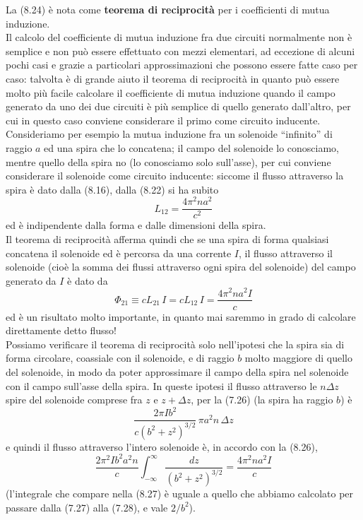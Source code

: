 La (8.24) \`e nota come \textbf{teorema di reciprocit\`a} per i coefficienti di
mutua induzione.\\
Il calcolo del coefficiente di mutua induzione fra due circuiti normalmente non
\`e semplice e non pu\`o essere effettuato con mezzi elementari, ad eccezione di
alcuni pochi casi e grazie a particolari approssimazioni che possono essere
fatte caso per caso: talvolta \`e di grande aiuto il teorema di reciprocit\`a in
quanto pu\`o essere molto pi\`u facile calcolare il coefficiente di mutua
induzione quando il campo generato da uno dei due circuiti \`e pi\`u semplice di
quello generato dall'altro, per cui in questo caso conviene considerare il primo
come circuito inducente. Consideriamo per esempio la mutua induzione fra un
solenoide ``infinito'' di raggio $a$ ed una spira che lo concatena; il campo del
solenoide lo conosciamo, mentre quello della spira no (lo conosciamo solo
sull'asse), per cui conviene considerare il solenoide come circuito inducente:
siccome il flusso attraverso la spira \`e dato dalla (8.16), dalla (8.22) si ha
subito
\begin{equation}
  L_{12}=\frac{4\pi^2na^2}{c^2}
  \tag{8.25}
\end{equation}
ed \`e indipendente dalla forma e dalle dimensioni della spira.\\
Il teorema di reciprocit\`a afferma quindi che se una spira di forma qualsiasi
concatena il solenoide ed \`e percorsa da una corrente $I$, il flusso attraverso
il solenoide (cio\`e la somma dei flussi attraverso ogni spira del solenoide)
del campo generato da $I$ \`e dato da
\begin{equation}
  \Phi_{21}\equiv cL_{21}\,I=cL_{12}\,I=\frac{4\pi^2na^2I}{c}
  \tag{8.26}
\end{equation}
ed \`e un risultato molto importante, in quanto mai saremmo in grado di
calcolare direttamente detto flusso!\\
Possiamo verificare il teorema di reciprocit\`a solo nell'ipotesi che la spira
sia di forma circolare, coassiale con il solenoide, e di raggio $b$ molto
maggiore di quello del solenoide, in modo da poter approssimare il campo della
spira nel solenoide con il campo sull'asse della spira. In queste ipotesi il
flusso attraverso le $n\Delta z$ spire del solenoide comprese fra $z$ e
$z+\Delta z$, per la (7.26) (la spira ha raggio $b$) \`e
\[
  \frac{2\pi Ib^2}{c(b^2+z^2)^{3/2}}\,\pi a^2n\,\Delta z
\]
e quindi il flusso attraverso l'intero solenoide \`e, in accordo con la (8.26),
\begin{equation}
  \frac{2\pi^2Ib^2a^2n}{c}\int_{-\infty}^\infty\frac{dz}{(b^2+z^2)^{3/2}}
  =\frac{4\pi^2na^2I}{c}
  \tag{8.27}
\end{equation}
(l'integrale che compare nella (8.27) \`e uguale a quello che abbiamo calcolato
per passare dalla (7.27) alla (7.28), e vale $2/b^2$).

